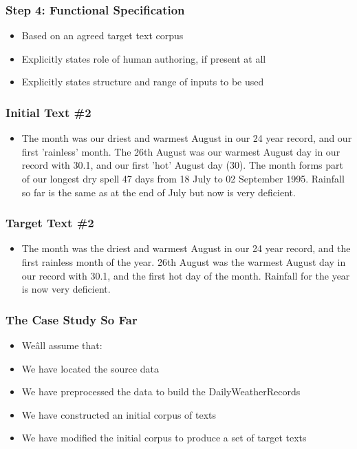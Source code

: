 \documentclass[compress,color=usenames]{beamer}
\begin{document}
\begin{frame}
\frametitle{Step 4: Functional Specification}

\label{f104}
\begin{itemize}
\item { {Based on an agreed target text corpus}}
\item { {Explicitly states role of human authoring, if present at all}}
\item { {Explicitly states structure and range of inputs to be used}}
\end{itemize}

\end{frame}

\begin{frame}
\frametitle{Initial Text \#2}

\label{f106}
\begin{itemize}
\item { {The month was our driest and warmest August in our 24 year record, and our first 'rainless' month. The 26th August was our warmest August day in our record with 30.1, and our first 'hot' August day (30). The month forms part of our longest dry spell 47 days from 18 July to 02 September 1995. Rainfall so far is the same as at the end of July but now is very deficient.}}
\end{itemize}

\end{frame}

\begin{frame}
\frametitle{Target Text \#2}

\label{f108}
\begin{itemize}
\item { {The month was the driest and warmest August in our 24 year record, and the first rainless month of the year. 26th August was the warmest August day in our record with 30.1, and the first hot day of the month. Rainfall for the year is now very deficient.}}
\end{itemize}

 \end{frame}

\begin{frame}
\frametitle{The Case Study So Far}

\label{f110}
\begin{itemize}
\item { {We\^all assume that:}}
\item { {We have located the source data}}
\item { {We have preprocessed the data to build the DailyWeatherRecords}}
\item { {We have constructed an initial corpus of texts}}
\item { {We have modified the initial corpus to produce a set of target texts}}
\end{itemize}

 \end{frame}
\end{document}
